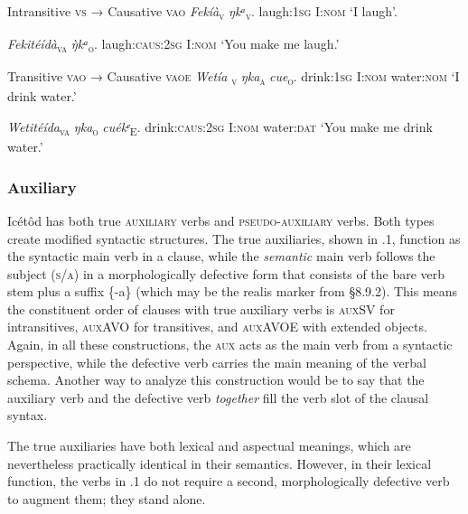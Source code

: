 \begin{table}
Intransitive \textsc{vs} → Causative \textsc{vao}
\textit{Fekíà}\textsc{\textsubscript{v}}     \textit{ŋkᵃ}\textsc{\textsubscript{v}}.
laugh:\textsc{1sg}   I:\textsc{nom}
‘I laugh’.




\textit{Fekitéídà}\textsc{\textsubscript{va}}   \textit{\`{ŋ}kᵃ}\textsc{\textsubscript{o}}.
laugh:\textsc{caus:2sg} I:\textsc{nom}
‘You make me laugh.’





Transitive \textsc{vao} → Causative \textsc{vaoe}
\textit{Wetía}\textsc{\textsubscript{ v}}     \textit{ŋka}\textsc{\textsubscript{a}}\textit{     cue}\textsc{\textsubscript{o}}.
drink:\textsc{1sg}   I:\textsc{nom}   water:\textsc{nom}
‘I drink water.’




\textit{Wetitéída}\textsc{\textsubscript{va}}\textit{ }  \textit{ŋka}\textsc{\textsubscript{o}}\textit{     cuékᵉ}\textsc{\textsubscript{E}}.
drink:\textsc{caus:2sg} I:\textsc{nom}    water:\textsc{dat}
‘You make me drink water.’




\subsubsection{Auxiliary }

Icétôd has both true \textsc{auxiliary} verbs and \textsc{pseudo-auxiliary} verbs. Both types create modified syntactic structures. The true auxiliaries, shown in .1, function as the syntactic main verb in a clause, while the \textit{semantic} main verb follows the subject (\textsc{s/a}) in a morphologically defective form that consists of the bare verb stem plus a suffix \{-a\} (which may be the realis marker from §8.9.2). This means the constituent order of clauses with true auxiliary verbs is \textsc{auxSV }for intransitives, \textsc{auxAVO }for transitives, and \textsc{auxAVOE} with extended objects. Again, in all these constructions, the \textsc{aux} acts as the main verb from a syntactic perspective, while the defective verb carries the main meaning of the verbal schema. Another way to analyze this construction would be to say that the auxiliary verb and the defective verb \textit{together} fill the verb slot of the clausal syntax.

The true auxiliaries have both lexical and aspectual meanings, which are nevertheless practically identical in their semantics. However, in their lexical function, the verbs in .1 do not require a second, morphologically defective verb to augment them; they stand alone.



\end{table}
